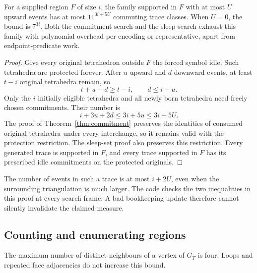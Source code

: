 \begin{theorem}\label{thm:fixed-region}
For a supplied region $F$ of size $i$, the family supported in $F$ with at
most $U$ upward events has at most $11^{3i+5U}$ commuting trace classes.
When $U=0$, the bound is $7^{3i}$. Both the commitment search and the sleep
search exhaust this family with polynomial overhead per encoding or
representative, apart from endpoint-predicate work.
\end{theorem}
\begin{proof}
Give every original tetrahedron outside $F$ the forced symbol idle. Such
tetrahedra are protected forever. After $u$ upward and $d$ downward events,
at least $t-i$ original tetrahedra remain, so
\[
 t+u-d\ge t-i,\qquad d\le i+u.
\]
Only the $i$ initially eligible tetrahedra and all newly born tetrahedra need
freely chosen commitments. Their number is
\begin{equation}\label{eq:active-incarnations}
 i+3u+2d\le3i+5u\le3i+5U.
\end{equation}
The proof of Theorem~\ref{thm:commitment} preserves the identities of consumed
original tetrahedra under every interchange, so it remains valid with the
protection restriction. The sleep-set proof also preserves this restriction.
Every generated trace is supported in $F$, and every trace supported in $F$
has its prescribed idle commitments on the protected originals.
\end{proof}

The number of events in such a trace is at most $i+2U$, even when the
surrounding triangulation is much larger. The code checks the two inequalities
in this proof at every search frame. A bad bookkeeping update therefore
cannot silently invalidate the claimed measure.

\subsection{Counting and enumerating regions}

The maximum number of distinct neighbours of a vertex of $G_T$ is four.
Loops and repeated face adjacencies do not increase this bound.

